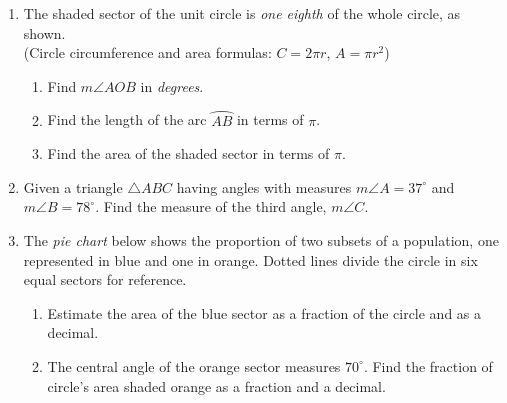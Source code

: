 \begin{enumerate}
  \item The shaded sector of the unit circle is \emph{one eighth} of the whole circle, as shown. \\(Circle circumference and area formulas: $C=2\pi r$, $A=\pi r^2$)
  \begin{multicols}{2}
  \raggedcolumns
  \begin{enumerate}[itemsep=1.5cm]
    \item Find $m \angle AOB$ in \emph{degrees}.
    \item Find the length of the arc $\wideparen{AB}$ in terms of $\pi$.
    \item Find the area of the shaded sector in terms of $\pi$.
  \end{enumerate}
  \end{multicols}

\item Given a triangle $\triangle ABC$ having angles with measures $m\angle A = 37^\circ$ and $m\angle B = 78^\circ$. Find the measure of the third angle, $m\angle C$.
  
\item The \emph{pie chart} below shows the proportion of two subsets of a population, one represented in blue and one in orange. Dotted lines divide the circle in six equal sectors for reference.
  \begin{multicols}{2}
  \raggedcolumns
  \begin{enumerate}[itemsep=1.5cm]
    \item Estimate the area of the blue sector as a fraction of the circle and as a decimal.
    \item The central angle of the orange sector measures $70^\circ$. Find the fraction of circle's area shaded orange as a fraction and a decimal.
  \end{enumerate}
  \end{multicols}


\end{enumerate}

